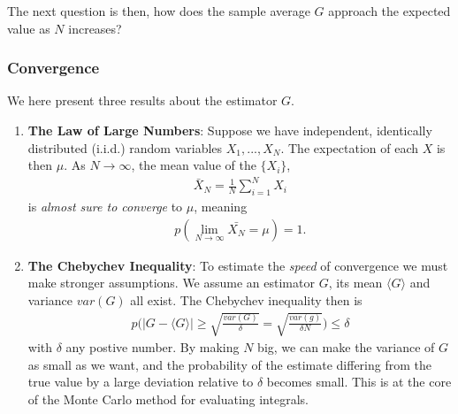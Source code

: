 \documentclass[twoside,english]{uiofysmaster}
\begin{document}
The next question is then, how does the sample average $G$ approach the expected value as $N$ increases?


\subsubsection{Convergence}
We here present three results about the estimator $G$.

\begin{enumerate}
\item \textbf{The Law of Large Numbers}: Suppose we have independent, identically distributed (i.i.d.) random variables $X_1,...,X_N$. The expectation of each $X$ is then $\mu$. As $N\rightarrow \infty$, the mean value of the $\{ X_i \}$, 
\begin{align}
	\bar{X}_N = \frac{1}{N} \sum_{i=1}^N X_i
\end{align}
is \textit{almost sure to converge} to $\mu$, meaning
\begin{align}
	p(\lim_{N\to \infty} \bar{X_N} = \mu) = 1 .
\end{align}

\item \textbf{The Chebychev Inequality}:
To estimate the \textit{speed} of convergence we must make stronger assumptions. We assume an estimator $G$, its mean $\langle G \rangle$ and variance $var(G)$ all exist. The Chebychev inequality then is
\begin{align}
	p\bigg (|G - \langle G \rangle | \geq \sqrt{\frac{var(G)}{\delta}} = \sqrt{\frac{var(g)}{\delta N}} \bigg ) \leq \delta 
\end{align}
with $\delta$ any postive number. By making $N$ big, we can make the variance of $G$ as small as we want, and the probability of the estimate differing from the true value by a large deviation relative to $\delta$ becomes small. This is at the core of the Monte Carlo method for evaluating integrals.


\end{enumerate}
\end{document}
